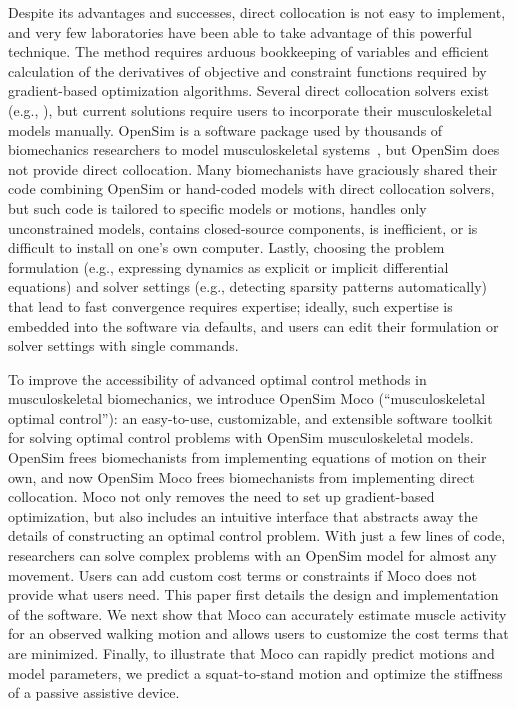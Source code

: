 \documentclass[10pt,letterpaper]{article}
\begin{document}
Despite its advantages and successes, direct collocation is not easy to implement, and very few laboratories have been able to take advantage of this powerful technique. The method requires arduous bookkeeping of variables and efficient calculation of the derivatives of objective and constraint functions required by gradient-based optimization algorithms. Several direct collocation solvers exist (e.g., \cite{Becerra:2010,Patterson:2014}), but current solutions require users to incorporate their musculoskeletal models manually. OpenSim is a software package used by thousands of biomechanics researchers to model musculoskeletal systems~\cite{Delp:2007ij,Seth:2018gg,Sherman:2011byc}, but OpenSim does not provide direct collocation. Many biomechanists have graciously shared their code combining OpenSim or hand-coded models with direct collocation solvers, but such code is tailored to specific models or motions, handles only unconstrained models, contains closed-source components, is inefficient, or is difficult to install on one’s own computer. Lastly, choosing the problem formulation (e.g., expressing dynamics as explicit or implicit differential equations) and solver settings (e.g., detecting sparsity patterns automatically) that lead to fast convergence requires expertise; ideally, such expertise is embedded into the software via defaults, and users can edit their formulation or solver settings with single commands.

To improve the accessibility of advanced optimal control methods in musculoskeletal biomechanics, we introduce OpenSim Moco (“musculoskeletal optimal control”): an easy-to-use, customizable, and extensible software toolkit for solving optimal control problems with OpenSim musculoskeletal models. OpenSim frees biomechanists from implementing equations of motion on their own, and now OpenSim Moco frees biomechanists from implementing direct collocation. Moco not only removes the need to set up gradient-based optimization, but also includes an intuitive interface that abstracts away the details of constructing an optimal control problem. With just a few lines of code, researchers can solve complex problems with an OpenSim model for almost any movement. Users can add custom cost terms or constraints if Moco does not provide what users need. This paper first details the design and implementation of the software. We next show that Moco can accurately estimate muscle activity for an observed walking motion and allows users to customize the cost terms that are minimized. Finally, to illustrate that Moco can rapidly predict motions and model parameters, we predict a squat-to-stand motion and optimize the stiffness of a passive assistive device.
\end{document}
